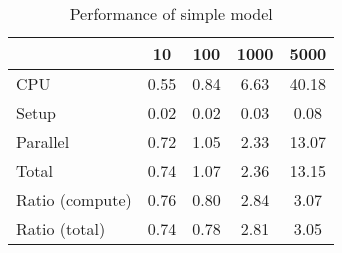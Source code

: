 \begin{table}[!h]
\centering
\caption{Performance of simple model}
\begin{tabular}{l*{4}{c}}\hline
& 10 &             100 &            1000 &            5000 \\ \hline
CPU &     0.55 &      0.84 &      6.63 &     40.18 \\
Setup &     0.02 &      0.02 &      0.03 &      0.08 \\
Parallel &     0.72 &      1.05 &      2.33 &     13.07 \\
Total &     0.74 &      1.07 &      2.36 &     13.15 \\
Ratio (compute) &     0.76 &      0.80 &      2.84 &      3.07 \\
Ratio (total) &     0.74 &      0.78 &      2.81 &      3.05 \\
\hline
\end{tabular}
\end{table}
